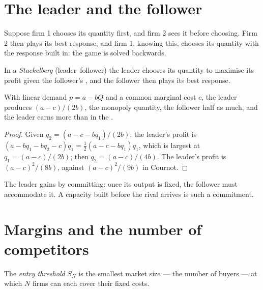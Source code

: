 \section{The leader and the follower}\label{sec:b1:cournot-and-bertrand:stackelberg}

Suppose firm 1 chooses its quantity first, and firm 2 sees it before
choosing. Firm 2 then plays its best response, and firm 1, knowing this,
chooses its quantity with the response built in: the game is solved
backwards.

\begin{definition}\label{def:b1:cournot-and-bertrand:stackelberg}
In a \emph{Stackelberg} (leader--follower) \emph{} the leader
chooses its quantity to maximise its profit given the follower's
, and the follower then plays its best response.
\end{definition}

\begin{proposition}\label{prop:b1:cournot-and-bertrand:leader}
With linear demand $p = a - bQ$ and a common marginal cost $c$, the leader
produces $(a - c)/(2b)$, the monopoly quantity, the follower half as much, and
the leader earns more than in the .
\end{proposition}

\begin{proof}
Given $q_2 = (a - c - bq_1)/(2b)$, the leader's profit is
$(a - b q_1 - b q_2 - c)q_1 = \tfrac12(a - c - bq_1)q_1$, which is largest at $q_1 = (a - c)/(2b)$; then
$q_2 = (a - c)/(4b)$. The leader's profit is $(a - c)^2/(8b)$, against $(a - c)^2/(9b)$ in
Cournot.
\end{proof}

The leader gains by committing: once its output is fixed, the follower
must accommodate it. A capacity built before the rival arrives is such a
commitment.

\section{Margins and the number of competitors}\label{sec:b1:cournot-and-bertrand:entry}

\begin{definition}\label{def:b1:cournot-and-bertrand:entry-threshold}
The \emph{entry threshold} $S_N$ is the smallest market size --- the number of
buyers --- at which $N$ firms can each cover their fixed costs.
\end{definition}

